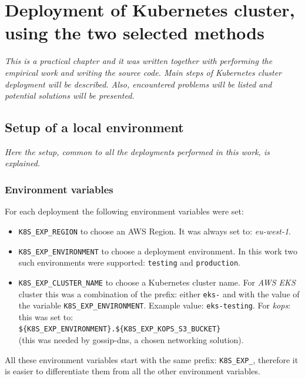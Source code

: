 \section{Deployment of Kubernetes cluster, using the two selected methods}
\label{5-depl}
\textit{This is a practical chapter and it was written together with performing the empirical work and writing the source code. Main steps of Kubernetes cluster deployment will be described. Also, encountered problems will be listed and potential solutions will be presented.}

\subsection{Setup of a local environment}
\textit{Here the setup, common to all the deployments performed in this work, is explained.}

\subsubsection{Environment variables}
For each deployment the following environment variables were set:
\begin{itemize}
\item \verb|K8S_EXP_REGION| to choose an AWS Region. It was always set to: \textit{eu-west-1}.
\item \verb|K8S_EXP_ENVIRONMENT| to choose a deployment environment. In this work two such environments were supported: \verb|testing| and \verb|production|.
\item \verb|K8S_EXP_CLUSTER_NAME| to choose a Kubernetes cluster name. For \textit{AWS EKS} cluster this was a combination of the prefix: either \verb|eks-| and with the value of the variable \verb|K8S_EXP_ENVIRONMENT|. Example value: \verb|eks-testing|. For \textit{kops}: this was set to: \\
\verb|${K8S_EXP_ENVIRONMENT}.${K8S_EXP_KOPS_S3_BUCKET}| \\
(this was needed by gossip-dns, a chosen networking solution).
\end{itemize}

All these environment variables start with the same prefix: \verb|K8S_EXP_|, therefore it is easier to differentiate them from all the other environment variables.

